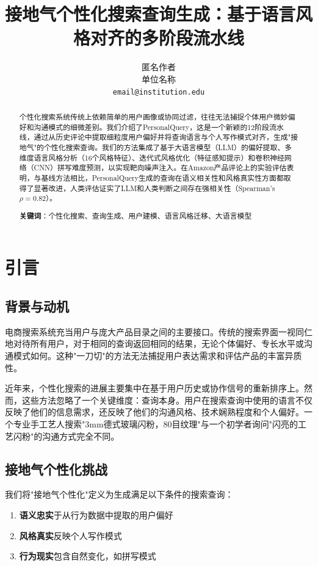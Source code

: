 \documentclass[11pt,a4paper]{article}
\title{\textbf{接地气个性化搜索查询生成：基于语言风格对齐的多阶段流水线}}
\author{
匿名作者 \\
单位名称 \\
\texttt{email@institution.edu}
}
\begin{document}
\maketitle

\begin{abstract}
个性化搜索系统传统上依赖简单的用户画像或协同过滤，往往无法捕捉个体用户微妙偏好和沟通模式的细微差别。我们介绍了PersonalQuery，这是一个新颖的12阶段流水线，通过从历史评论中提取细粒度用户偏好并将查询语言与个人写作模式对齐，生成"接地气"的个性化搜索查询。我们的方法集成了基于大语言模型（LLM）的偏好提取、多维度语言风格分析（16个风格特征）、迭代式风格优化（特征感知提示）和卷积神经网络（CNN）拼写难度预测，以实现靶向噪声注入。在Amazon产品评论上的实验评估表明，与基线方法相比，PersonalQuery生成的查询在语义相关性和风格真实性方面都取得了显著改进，人类评估证实了LLM和人类判断之间存在强相关性（Spearman's $\rho = 0.82$）。

\textbf{关键词}：个性化搜索、查询生成、用户建模、语言风格迁移、大语言模型
\end{abstract}

\section{引言}

\subsection{背景与动机}

电商搜索系统充当用户与庞大产品目录之间的主要接口。传统的搜索界面一视同仁地对待所有用户，对于相同的查询返回相同的结果，无论个体偏好、专长水平或沟通模式如何。这种"一刀切"的方法无法捕捉用户表达需求和评估产品的丰富异质性。

近年来，个性化搜索的进展主要集中在基于用户历史或协作信号的重新排序上。然而，这些方法忽略了一个关键维度：查询本身。用户在搜索查询中使用的语言不仅反映了他们的信息需求，还反映了他们的沟通风格、技术娴熟程度和个人偏好。一个专业手工艺人搜索"3mm德式玻璃闪粉，80目纹理"与一个初学者询问"闪亮的工艺闪粉"的沟通方式完全不同。

\subsection{接地气个性化挑战}

我们将"接地气个性化"定义为生成满足以下条件的搜索查询：
\begin{enumerate}
    \item \textbf{语义忠实}于从行为数据中提取的用户偏好
    \item \textbf{风格真实}反映个人写作模式
    \item \textbf{行为现实}包含自然变化，如拼写模式
\end{enumerate}
\end{document}
